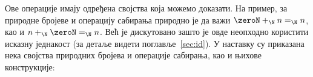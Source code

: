 Ове операције имају одређена својства која можемо доказати. На пример, за природне бројеве и операцију сабирања природно је да важи $\zeroN +_\N n =_\N n$, као и $n +_\N \zeroN =_\N n$. Већ је дискутовано зашто је овде неопходно користити исказну једнакост (за детаље видети поглавље~\ref{sec:id}). У наставку су приказана нека својства природних бројева и операције сабирања, као и њихове конструкције:
\begin{code}%
\>[0]\AgdaSpace{}%
\AgdaSymbol{:}\AgdaSpace{}%
\AgdaSymbol{(}\AgdaSpace{}%
\AgdaSymbol{:}\AgdaSpace{}%
\AgdaSymbol{)}\AgdaSpace{}%
\AgdaSpace{}%
\AgdaSpace{}%
\AgdaSpace{}%
\AgdaSpace{}%
\AgdaOperator{\AgdaFunction{==}}\AgdaSpace{}%
\<%
\\
\>[0]\AgdaSpace{}%
\AgdaSpace{}%
\AgdaSymbol{=}\AgdaSpace{}%
\AgdaSpace{}%
\<%
\\
%
\\[\AgdaEmptyExtraSkip]%
\>[0]\AgdaSpace{}%
\AgdaSymbol{:}\AgdaSpace{}%
\AgdaSymbol{(}\AgdaSpace{}%
\AgdaSymbol{:}\AgdaSpace{}%
\AgdaSymbol{)}\AgdaSpace{}%
\AgdaSpace{}%
\AgdaSpace{}%
\AgdaSpace{}%
\AgdaSpace{}%
\AgdaOperator{\AgdaFunction{==}}\AgdaSpace{}%
\<%
\\
\>[0]\AgdaSpace{}%
%
\>[27]\AgdaSymbol{=}\AgdaSpace{}%
\AgdaSpace{}%
\<%
\\
\>[0]\AgdaSpace{}%
\AgdaSymbol{(}\AgdaSpace{}%
\AgdaSymbol{)}\AgdaSpace{}%
\AgdaSymbol{=}\AgdaSpace{}%
\AgdaSpace{}%
\AgdaSpace{}%
\AgdaSymbol{(}\AgdaSpace{}%
\AgdaSymbol{)}\<%
\\
%
\\[\AgdaEmptyExtraSkip]%
\>[0]\AgdaSpace{}%
\AgdaSymbol{:}\AgdaSpace{}%
\AgdaSymbol{(}\AgdaSpace{}%
\AgdaSymbol{:}\AgdaSpace{}%
\AgdaSymbol{)}\AgdaSpace{}%
\AgdaSpace{}%
\AgdaSpace{}%
\AgdaSpace{}%
\AgdaSpace{}%
\AgdaOperator{\AgdaFunction{==}}\AgdaSpace{}%

\end{code}
